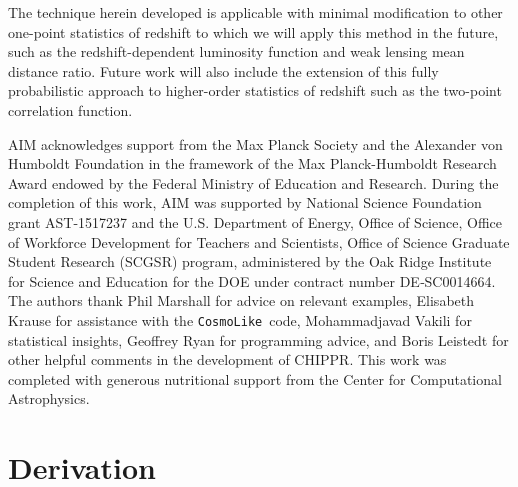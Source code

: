 \documentclass[iop]{emulateapj}
\newcommand{\todo}[3]{{\color{#2}\emph{#1}: #3}}
\newcommand{\aim}[1]{\todo{AIM}{red}{#1}}
\newcommand{\project}[1]{\textsc{#1}}
\newcommand{\Chippr}{\project{CHIPPR}}%
\newcommand{\repo}[1]{\texttt{#1}}
\newcommand{\cosmolike}{\repo{CosmoLike}}
\newcommand{\gvn}{\mid}%
\begin{document}
The technique herein developed is applicable with minimal modification to other one-point statistics of redshift to which we will apply this method in the future, such as the redshift-dependent luminosity function and weak lensing mean distance ratio.
Future work will also include the extension of this fully probabilistic approach to higher-order statistics of redshift such as the two-point correlation function.

\begin{acknowledgements}
	AIM acknowledges support from the Max Planck Society and the Alexander von Humboldt Foundation in the framework of the Max Planck-Humboldt Research Award endowed by the Federal Ministry of Education and Research.
	During the completion of this work, AIM was supported by National Science Foundation grant AST-1517237 and the U.S. Department of Energy, Office of Science, Office of Workforce Development for Teachers and Scientists, Office of Science Graduate Student Research (SCGSR) program, administered by the Oak Ridge Institute for Science and Education for the DOE under contract number DE‐SC0014664.
	The authors thank Phil Marshall for advice on relevant examples, Elisabeth Krause for assistance with the \cosmolike\ code, Mohammadjavad Vakili for statistical insights, Geoffrey Ryan for programming advice, and Boris Leistedt for other helpful comments in the development of \Chippr.
	This work was completed with generous nutritional support from the Center for Computational Astrophysics.
\end{acknowledgements}


\appendix

\section{Derivation}
\label{app:math}

\end{document}
